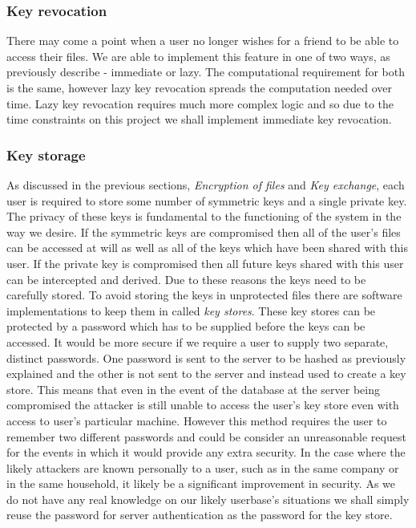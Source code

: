 \documentclass[12pt, titlepage]{article}
\begin{document}
\subsubsection{Key revocation}
There may come a point when a user no longer wishes for a friend to be able to access their files. We are able to implement this feature in one of two ways, as previously describe - immediate or lazy. The computational requirement for both is the same, however lazy key revocation spreads the computation needed over time. Lazy key revocation requires much more complex logic and so due to the time constraints on this project we shall implement immediate key revocation. 

\subsubsection{Key storage}
As discussed in the previous sections, \textit{Encryption of files} and \textit{Key exchange}, each user is required to store some number of symmetric keys and a single private key. The privacy of these keys is fundamental to the functioning of the system in the way we desire. If the symmetric keys are compromised then all of the user's files can be accessed at will as well as all of the keys which have been shared with this user. If the private key is compromised then all future keys shared with this user can be intercepted and derived. Due to these reasons the keys need to be carefully stored. To avoid storing the keys in unprotected files there are software implementations to keep them in called \textit{key stores}. These key stores can be protected by a password which has to be supplied before the keys can be accessed. It would be more secure if we require a user to supply two separate, distinct passwords. One password is sent to the server to be hashed as previously explained and the other is not sent to the server and instead used to create a key store. This means that even in the event of the database at the server being compromised the attacker is still unable to access the user's key store even with access to user's particular machine. However this method requires the user to remember two different passwords and could be consider an unreasonable request for the events in which it would provide any extra security. In the case where the likely attackers are known personally to a user, such as in the same company or in the same household, it likely be a significant improvement in security. As we do not have any real knowledge on our likely userbase's situations we shall simply reuse the password for server authentication as the password for the key store.
\end{document}
